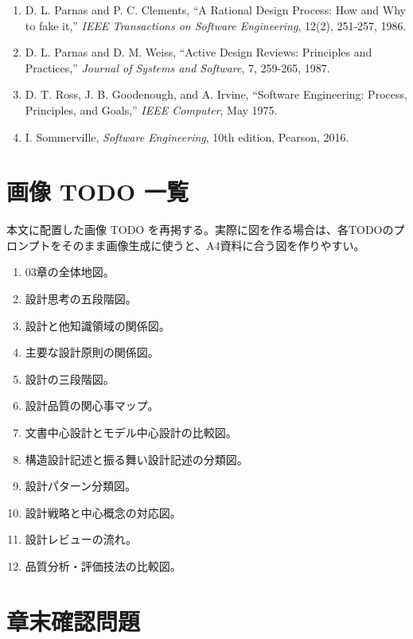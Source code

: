 \documentclass[10.5pt,a4paper]{ltjsarticle}
\begin{document}
\begin{enumerate}
  \item D. L. Parnas and P. C. Clements, “A Rational Design Process: How and Why to fake it,” \textit{IEEE Transactions on Software Engineering}, 12(2), 251-257, 1986.
  \item D. L. Parnas and D. M. Weiss, “Active Design Reviews: Principles and Practices,” \textit{Journal of Systems and Software}, 7, 259-265, 1987.
  \item D. T. Ross, J. B. Goodenough, and A. Irvine, “Software Engineering: Process, Principles, and Goals,” \textit{IEEE Computer}, May 1975.
  \item I. Sommerville, \textit{Software Engineering}, 10th edition, Pearson, 2016.
\end{enumerate}

\section{画像 TODO 一覧}

本文に配置した画像 TODO を再掲する。実際に図を作る場合は、各TODOのプロンプトをそのまま画像生成に使うと、A4資料に合う図を作りやすい。

\begin{enumerate}
  \item 03章の全体地図。
  \item 設計思考の五段階図。
  \item 設計と他知識領域の関係図。
  \item 主要な設計原則の関係図。
  \item 設計の三段階図。
  \item 設計品質の関心事マップ。
  \item 文書中心設計とモデル中心設計の比較図。
  \item 構造設計記述と振る舞い設計記述の分類図。
  \item 設計パターン分類図。
  \item 設計戦略と中心概念の対応図。
  \item 設計レビューの流れ。
  \item 品質分析・評価技法の比較図。
\end{enumerate}

\section{章末確認問題}
\end{document}
